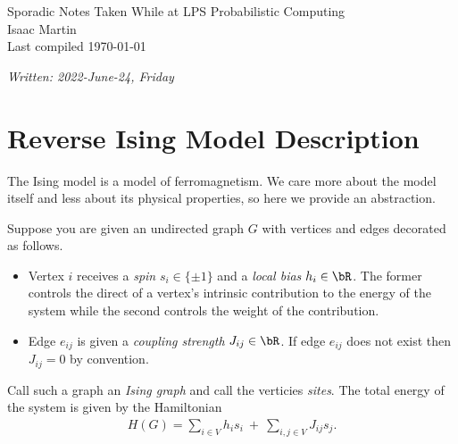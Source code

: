 

\newcommand{\entry}[1]
{
	\newpage
	\addtocounter{entry-counter}{1}
    \tchap{Entry \arabic{entry-counter}}
	\vspace{-1.5em}
    \begin{center}
		\small \emph{Written: #1}
    \end{center}
}


\pagestyle{empty}
	\LARGE
\begin{center}
	Sporadic Notes Taken While at LPS Probabilistic Computing \\
	\Large
	Isaac Martin \\
    Last compiled \today
\end{center}
\normalsize
\vspace{-2mm}
\hru
\tableofcontents

\entry{2022-June-24, Friday}

\section{Reverse Ising Model Description}
The Ising model is a model of ferromagnetism. We care more about the model itself and less about its physical properties, so here we provide an abstraction. 

\begin{defn}\label{defn:ising-graph}
	Suppose you are given an undirected graph $G$ with vertices and edges decorated as follows. 
	\begin{itemize}
			\item Vertex $i$ receives a \emph{spin} $s_i \in \{\pm 1\}$ and a \emph{local bias} $h_i \in \bR$. The former controls the direct of a vertex's intrinsic contribution to the energy of the system while the second controls the weight of the contribution.
			\item Edge $e_{ij}$ is given a \emph{coupling strength} $J_{ij} \in \bR$. If edge $e_{ij}$ does not exist then $J_{ij} = 0$ by convention.
	\end{itemize}
	Call such a graph an \emph{Ising graph} and call the verticies \emph{sites}. The total energy of the system is given by the Hamiltonian
	\begin{align*}
		H(G) = \sum_{i \in V} h_is_i ~+~ \sum_{i,j \in V} J_{ij}s_j.
	\end{align*}
\end{defn}


